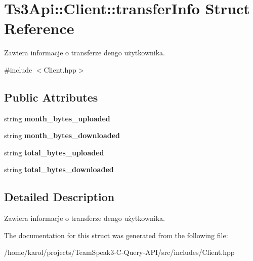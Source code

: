\hypertarget{struct_ts3_api_1_1_client_1_1transfer_info}{}\section{Ts3\+Api\+:\+:Client\+:\+:transfer\+Info Struct Reference}
\label{struct_ts3_api_1_1_client_1_1transfer_info}


Zawiera informacje o transferze dengo użytkownika.  




{\ttfamily \#include $<$Client.\+hpp$>$}

\subsection*{Public Attributes}
\begin{DoxyCompactItemize}
\item 
string {\bfseries month\+\_\+bytes\+\_\+uploaded}\hypertarget{struct_ts3_api_1_1_client_1_1transfer_info_a487dfecb58a865b099ead7e1ef8e9dbf}{}\label{struct_ts3_api_1_1_client_1_1transfer_info_a487dfecb58a865b099ead7e1ef8e9dbf}

\item 
string {\bfseries month\+\_\+bytes\+\_\+downloaded}\hypertarget{struct_ts3_api_1_1_client_1_1transfer_info_a5051375ed95b8aa5babc0cb5acd435df}{}\label{struct_ts3_api_1_1_client_1_1transfer_info_a5051375ed95b8aa5babc0cb5acd435df}

\item 
string {\bfseries total\+\_\+bytes\+\_\+uploaded}\hypertarget{struct_ts3_api_1_1_client_1_1transfer_info_a4932b3fb406e759c6afe5e1e76935104}{}\label{struct_ts3_api_1_1_client_1_1transfer_info_a4932b3fb406e759c6afe5e1e76935104}

\item 
string {\bfseries total\+\_\+bytes\+\_\+downloaded}\hypertarget{struct_ts3_api_1_1_client_1_1transfer_info_aaee3872daf3bc112e7d7042d5b7bcebc}{}\label{struct_ts3_api_1_1_client_1_1transfer_info_aaee3872daf3bc112e7d7042d5b7bcebc}

\end{DoxyCompactItemize}


\subsection{Detailed Description}
Zawiera informacje o transferze dengo użytkownika. 

The documentation for this struct was generated from the following file\+:\begin{DoxyCompactItemize}
\item 
/home/karol/projects/\+Team\+Speak3-\/\+C-\/\+Query-\/\+A\+P\+I/src/includes/Client.\+hpp\end{DoxyCompactItemize}
